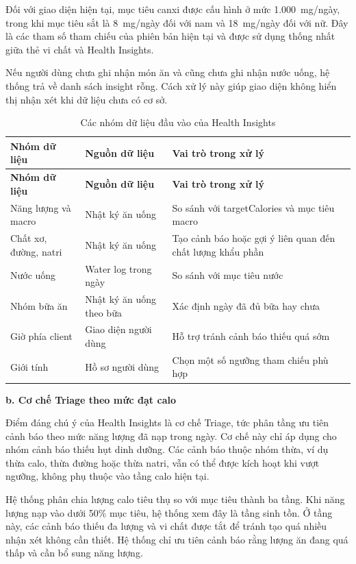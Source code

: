 \documentclass[12pt, a4paper]{report}
\begin{document}
Đối với giao diện hiện tại, mục tiêu canxi được cấu hình ở mức 1.000~mg/ngày, trong khi mục tiêu sắt là 8~mg/ngày đối với nam và 18~mg/ngày đối với nữ. Đây là các tham số tham chiếu của phiên bản hiện tại và được sử dụng thống nhất giữa thẻ vi chất và Health Insights.

Nếu người dùng chưa ghi nhận món ăn và cũng chưa ghi nhận nước uống, hệ thống trả về danh sách insight rỗng. Cách xử lý này giúp giao diện không hiển thị nhận xét khi dữ liệu chưa có cơ sở.

\begin{longtable}{|>{\raggedright\arraybackslash}p{4cm}|>{\raggedright\arraybackslash}p{4cm}|p{7cm}|}
\caption{Các nhóm dữ liệu đầu vào của Health Insights}
\label{tab:health_insights_data} \\
\hline
\textbf{Nhóm dữ liệu} & \textbf{Nguồn dữ liệu} & \textbf{Vai trò trong xử lý} \\
\hline
\endfirsthead
\hline
\textbf{Nhóm dữ liệu} & \textbf{Nguồn dữ liệu} & \textbf{Vai trò trong xử lý} \\
\hline
\endhead

Năng lượng và macro & Nhật ký ăn uống & So sánh với targetCalories và mục tiêu macro \\
\hline
Chất xơ, đường, natri & Nhật ký ăn uống & Tạo cảnh báo hoặc gợi ý liên quan đến chất lượng khẩu phần \\
\hline
Nước uống & Water log trong ngày & So sánh với mục tiêu nước \\
\hline
Nhóm bữa ăn & Nhật ký ăn uống theo bữa & Xác định ngày đã đủ bữa hay chưa \\
\hline
Giờ phía client & Giao diện người dùng & Hỗ trợ tránh cảnh báo thiếu quá sớm \\
\hline
Giới tính & Hồ sơ người dùng & Chọn một số ngưỡng tham chiếu phù hợp \\
\hline
\end{longtable}

\textbf{b. Cơ chế Triage theo mức đạt calo}

Điểm đáng chú ý của Health Insights là cơ chế Triage, tức phân tầng ưu tiên cảnh báo theo mức năng lượng đã nạp trong ngày. Cơ chế này chỉ áp dụng cho nhóm cảnh báo thiếu hụt dinh dưỡng. Các cảnh báo thuộc nhóm thừa, ví dụ thừa calo, thừa đường hoặc thừa natri, vẫn có thể được kích hoạt khi vượt ngưỡng, không phụ thuộc vào tầng calo hiện tại.

Hệ thống phân chia lượng calo tiêu thụ so với mục tiêu thành ba tầng. Khi năng lượng nạp vào dưới 50\% mục tiêu, hệ thống xem đây là tầng sinh tồn. Ở tầng này, các cảnh báo thiếu đa lượng và vi chất được tắt để tránh tạo quá nhiều nhận xét không cần thiết. Hệ thống chỉ ưu tiên cảnh báo rằng lượng ăn đang quá thấp và cần bổ sung năng lượng.
\end{document}
